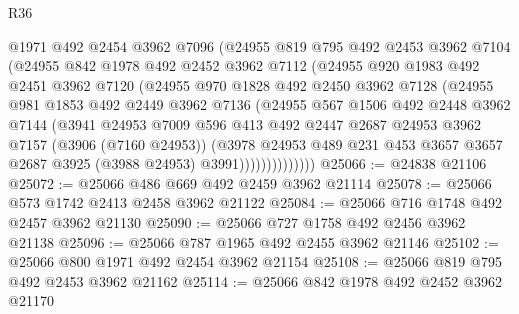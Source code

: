 \begin{lexlean}{R36}
\begin{coremodule}
                @1971
                @492
                @2454
                @3962
                @7096
                (@24955
                  @819
                  @795
                  @492
                  @2453
                  @3962
                  @7104
                  (@24955
                    @842
                    @1978
                    @492
                    @2452
                    @3962
                    @7112
                    (@24955
                      @920
                      @1983
                      @492
                      @2451
                      @3962
                      @7120
                      (@24955
                        @970
                        @1828
                        @492
                        @2450
                        @3962
                        @7128
                        (@24955
                          @981
                          @1853
                          @492
                          @2449
                          @3962
                          @7136
                          (@24955
                            @567
                            @1506
                            @492
                            @2448
                            @3962
                            @7144
                            (@3941
                              @24953
                              @7009
                              @596
                              @413
                              @492
                              @2447
                              @2687
                              @24953
                              @3962
                              @7157
                              (@3906 (@7160 @24953))
                              (@3978
                                @24953
                                @489
                                @231
                                @453
                                @3657
                                @3657
                                @2687
                                @3925
                                (@3988 @24953)
                                @3991))))))))))))))
@25066 := @24838 @21106
@25072 := @25066 @486 @669 @492 @2459 @3962 @21114
@25078 := @25066 @573 @1742 @2413 @2458 @3962 @21122
@25084 := @25066 @716 @1748 @492 @2457 @3962 @21130
@25090 := @25066 @727 @1758 @492 @2456 @3962 @21138
@25096 := @25066 @787 @1965 @492 @2455 @3962 @21146
@25102 := @25066 @800 @1971 @492 @2454 @3962 @21154
@25108 := @25066 @819 @795 @492 @2453 @3962 @21162
@25114 := @25066 @842 @1978 @492 @2452 @3962 @21170

\end{coremodule}
\end{lexlean}
